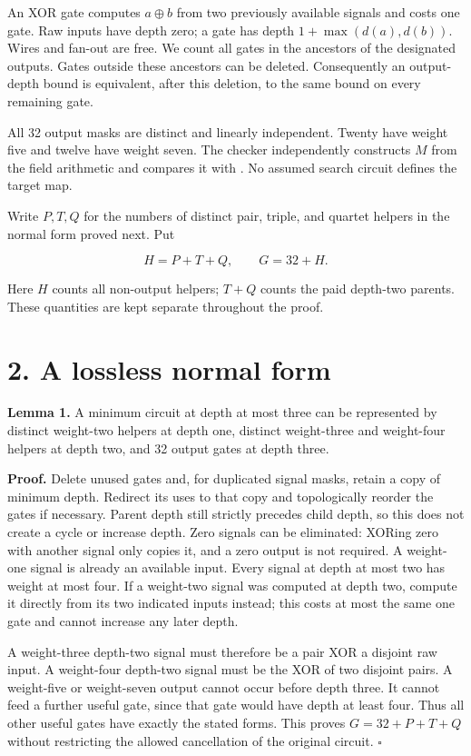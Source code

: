 An XOR gate computes \(a\oplus b\) from two previously available signals and costs one gate. Raw inputs have depth zero; a gate has depth \(1+\max(d(a),d(b))\). Wires and fan-out are free. We count all gates in the ancestors of the designated outputs. Gates outside these ancestors can be deleted. Consequently an output-depth bound is equivalent, after this deletion, to the same bound on every remaining gate.

All 32 output masks are distinct and linearly independent. Twenty have weight five and twelve have weight seven. The checker independently constructs \(M\) from the field arithmetic and compares it with \texttt{}. No assumed search circuit defines the target map.

Write \(P,T,Q\) for the numbers of distinct pair, triple, and quartet helpers in the normal form proved next. Put

\[H=P+T+Q,\qquad G=32+H.\]

Here \(H\) counts all non-output helpers; \(T+Q\) counts the paid depth-two parents. These quantities are kept separate throughout the proof.

\hypertarget{a-lossless-normal-form}{%
\section{2. A lossless normal form}\label{a-lossless-normal-form}}

\textbf{Lemma 1.} A minimum circuit at depth at most three can be represented by distinct weight-two helpers at depth one, distinct weight-three and weight-four helpers at depth two, and 32 output gates at depth three.

\textbf{Proof.} Delete unused gates and, for duplicated signal masks, retain a copy of minimum depth. Redirect its uses to that copy and topologically reorder the gates if necessary. Parent depth still strictly precedes child depth, so this does not create a cycle or increase depth. Zero signals can be eliminated: XORing zero with another signal only copies it, and a zero output is not required. A weight-one signal is already an available input. Every signal at depth at most two has weight at most four. If a weight-two signal was computed at depth two, compute it directly from its two indicated inputs instead; this costs at most the same one gate and cannot increase any later depth.

A weight-three depth-two signal must therefore be a pair XOR a disjoint raw input. A weight-four depth-two signal must be the XOR of two disjoint pairs. A weight-five or weight-seven output cannot occur before depth three. It cannot feed a further useful gate, since that gate would have depth at least four. Thus all other useful gates have exactly the stated forms. This proves \(G=32+P+T+Q\) without restricting the allowed cancellation of the original circuit. \(\square\)

